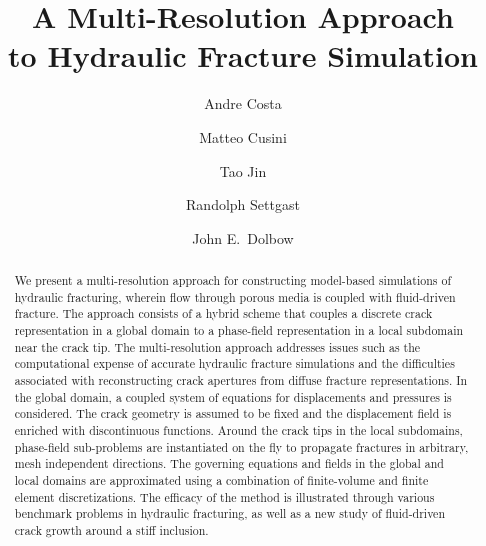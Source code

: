 \documentclass[12pt]{article}
\begin{document}
\title{A Multi-Resolution Approach \\ to Hydraulic Fracture Simulation}

\author[a]{Andre Costa}
\author[b]{Matteo Cusini}
\author[c]{Tao Jin}
\author[b]{Randolph Settgast}
\author[a, *]{John E.\ Dolbow}





\date{ }
\maketitle

\begin{abstract}
We present a multi-resolution approach for constructing model-based simulations of hydraulic fracturing, wherein flow through porous media is coupled with fluid-driven fracture.  The approach consists of a hybrid scheme that couples a discrete crack representation in a global domain to a phase-field representation in a local subdomain near the crack tip. 
The multi-resolution approach addresses issues such as the computational expense of accurate hydraulic fracture simulations and the difficulties associated with reconstructing crack apertures from diffuse fracture representations. 
In the global domain, a coupled system of equations for displacements and pressures is considered. The crack geometry is assumed to be fixed and the displacement field is enriched with discontinuous functions. Around the crack tips in the local subdomains, phase-field sub-problems are instantiated on the fly to propagate fractures in arbitrary, mesh independent directions. The governing equations and fields in the global and local domains are approximated using a combination of finite-volume and finite element discretizations.  The efficacy of the method is illustrated through various benchmark problems in hydraulic fracturing, as well as a new study of fluid-driven crack growth around a stiff inclusion.  

\end{abstract}
\end{document}
